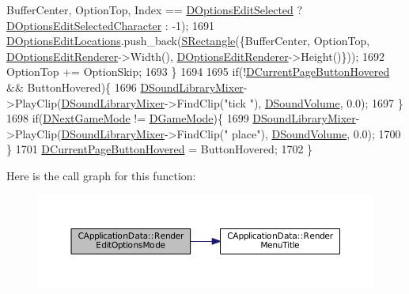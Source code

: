 \begin{DoxyCode}
      BufferCenter, OptionTop, Index == \hyperlink{classCApplicationData_aee4aa5eb5b89b86eb2648d0f9c7358f9}{DOptionsEditSelected} ? 
      \hyperlink{classCApplicationData_a921d69021fc61e51d12d8a26a5ac1a89}{DOptionsEditSelectedCharacter} : -1);
1691         \hyperlink{classCApplicationData_ab4e6804c6e50cca45ab3c3071588da34}{DOptionsEditLocations}.push\_back(\hyperlink{structSRectangle}{SRectangle}(\{BufferCenter, OptionTop,
       \hyperlink{classCApplicationData_ad445b9a4d742414d09196de7cd8a5b26}{DOptionsEditRenderer}->Width(), \hyperlink{classCApplicationData_ad445b9a4d742414d09196de7cd8a5b26}{DOptionsEditRenderer}->Height()\}));
1692         OptionTop += OptionSkip;
1693     \}
1694     
1695     \textcolor{keywordflow}{if}(!\hyperlink{classCApplicationData_a96b3a9b5c9965540007dff3fa85587fa}{DCurrentPageButtonHovered} && ButtonHovered)\{
1696         \hyperlink{classCApplicationData_aa1e6876121bb4fb229ec6b930a8a6766}{DSoundLibraryMixer}->PlayClip(\hyperlink{classCApplicationData_aa1e6876121bb4fb229ec6b930a8a6766}{DSoundLibraryMixer}->FindClip(\textcolor{stringliteral}{"tick
      "}), \hyperlink{classCApplicationData_aa6e540f860dcb1929ef36ddce3be3691}{DSoundVolume}, 0.0);
1697     \}
1698     \textcolor{keywordflow}{if}(\hyperlink{classCApplicationData_a3b67edeacd70201dcf96fa9fa8aa2107}{DNextGameMode} != \hyperlink{classCApplicationData_a2f906f2b4208ecb2a057e6b62e549685}{DGameMode})\{
1699         \hyperlink{classCApplicationData_aa1e6876121bb4fb229ec6b930a8a6766}{DSoundLibraryMixer}->PlayClip(\hyperlink{classCApplicationData_aa1e6876121bb4fb229ec6b930a8a6766}{DSoundLibraryMixer}->FindClip(\textcolor{stringliteral}{"
      place"}), \hyperlink{classCApplicationData_aa6e540f860dcb1929ef36ddce3be3691}{DSoundVolume}, 0.0);
1700     \}
1701     \hyperlink{classCApplicationData_a96b3a9b5c9965540007dff3fa85587fa}{DCurrentPageButtonHovered} = ButtonHovered;
1702 \}
\end{DoxyCode}
Here is the call graph for this function\+:\nopagebreak
\begin{figure}[H]
\begin{center}
\leavevmode
\includegraphics[width=350pt]{classCApplicationData_a7da1dd0b9a8d7c68d8df5f60b4e94189_cgraph}
\end{center}
\end{figure}
